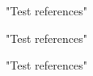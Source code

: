 

\newpage
{}
\begin{thebibliography}{10}

"Test references"

"Test references"

"Test references"

\end{thebibliography}

